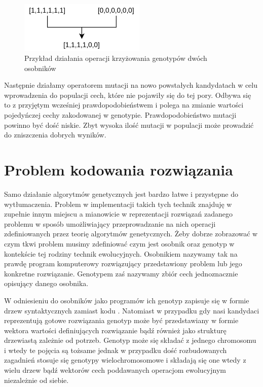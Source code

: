 \documentclass[12pt, oneside, a4paper]{report}
\begin{document}
\begin{figure}[h]
	\centering
	\includegraphics[width=6cm]{fig32.png}
	\caption{Przykład działania operacji krzyżowania genotypów dwóch osobników}
	\label{fig: 3.2}
\end{figure}

Następnie działamy operatorem mutacji na nowo powstałych kandydatach w celu wprowadzenia do populacji cech, które nie pojawiły się do tej pory. Odbywa się to z przyjętym wcześniej prawdopodobieństwem i polega na zmianie wartości pojedyńczej cechy zakodowanej w genotypie. Prawdopodobieństwo mutacji powinno być dość niskie. Zbyt wysoka ilość mutacji w populacji może prowadzić do zniszczenia dobrych wyników.

\section{Problem kodowania rozwiązania}

Samo działanie algorytmów genetycznych jest bardzo łatwe i przystępne do wytłumaczenia. Problem w implementacji takich tych technik znajduję w zupełnie innym miejscu a mianowicie w reprezentacji rozwiązań zadanego problemu w sposób umożliwiający przeprowadzanie na nich operacji zdefiniowanych przez teorię algorytmów genetycznych. Żeby dobrze zobrazować w czym tkwi problem musimy zdefiniować czym jest osobnik oraz genotyp w kontekście tej rodziny technik ewolucyjnych. Osobnikiem nazywamy tak na prawdę program komputerowy rozwiązujący przedstawiony problem lub jego konkretne rozwiązanie. Genotypem zaś nazywamy zbiór cech jednoznacznie opisujący danego osobnika. 

W odniesieniu do osobników jako programów ich genotyp zapisuje się w formie drzew syntaktycznych zamiast kodu \citep{poli08:fieldguide}. Natomiast w przypadku gdy nasi kandydaci reprezentują gotowe rozwiązania genotyp może być przedstawiany w formie wektora wartości definiujących rozwiązanie bądź również jako strukturę drzewiastą zależnie od potrzeb. Genotyp może się składać z jednego chromosomu i wtedy te pojęcia są tożsame jednak w przypadku dość rozbudowanych zagadnień stosuje się genotypy wielochromosomowe i składają się one wtedy z wielu drzew bądź wektorów cech poddawanych operacjom ewolucyjnym niezależnie od siebie.
\end{document}
